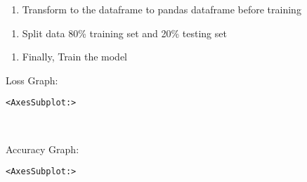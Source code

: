 \documentclass[11pt]{article}
\makeatletter
\providecommand{\tightlist}{%
      \setlength{\itemsep}{0pt}\setlength{\parskip}{0pt}}
\newcommand{\boxspacing}{\kern\kvtcb@left@rule\kern\kvtcb@boxsep}
\newcommand{\prompt}[4]{
        {\ttfamily\llap{{\color{#2}[#3]:\hspace{3pt}#4}}\vspace{-\baselineskip}}
    }
\makeatother
\begin{document}
    \begin{enumerate}
\def\labelenumi{\arabic{enumi}.}
\setcounter{enumi}{2}
\tightlist
\item
  Transform to the dataframe to pandas dataframe before training
\end{enumerate}

    \begin{enumerate}
\def\labelenumi{\arabic{enumi}.}
\setcounter{enumi}{3}
\tightlist
\item
  Split data 80\% training set and 20\% testing set
\end{enumerate}

    \begin{enumerate}
\def\labelenumi{\arabic{enumi}.}
\setcounter{enumi}{4}
\tightlist
\item
  Finally, Train the model
\end{enumerate}

    Loss Graph:

            \begin{tcolorbox}[breakable, size=fbox, boxrule=.5pt, pad at break*=1mm, opacityfill=0]
\prompt{Out}{outcolor}{71}{\boxspacing}
\begin{Verbatim}[commandchars=\\\{\}]
<AxesSubplot:>
\end{Verbatim}
\end{tcolorbox}
        
    \begin{center}
    \end{center}
    { \hspace*{\fill} \\}
    
    Accuracy Graph:

            \begin{tcolorbox}[breakable, size=fbox, boxrule=.5pt, pad at break*=1mm, opacityfill=0]
\prompt{Out}{outcolor}{72}{\boxspacing}
\begin{Verbatim}[commandchars=\\\{\}]
<AxesSubplot:>
\end{Verbatim}
\end{tcolorbox}
        
    \begin{center}
    \end{center}
    { \hspace*{\fill} \\}
    
\end{document}
